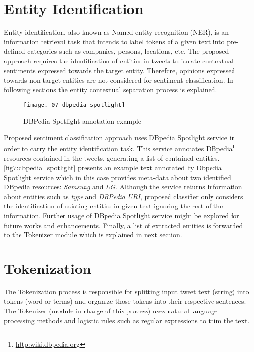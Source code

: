 \pagebreak

\section{Entity Identification}

Entity identification, also known as Named-entity recognition (NER), is an information retrieval task that intends to label tokens of a given text into pre-defined categories such as companies, persons, locations, etc. The proposed approach requires the identification of entities in tweets to isolate contextual sentiments expressed towards the target entity. Therefore, opinions expressed towards non-target entities are not considered for sentiment classification. In following sections the entity contextual separation process is explained. 

\begin{figure}[H]
    \centering
    \texttt{[image: 07\_dbpedia\_spotlight]}
    \caption{DBPedia Spotlight annotation example}
    \label{fig7:dbpedia_spotlight}
\end{figure}

Proposed sentiment classification approach uses DBpedia Spotlight service in order to carry the entity identification task. This service annotates DBpedia\footnote{\url{http:wiki.dbpedia.org}} resources contained in the tweets, generating a list of contained entities. \autoref{fig7:dbpedia_spotlight} presents an example text annotated by Dbpedia Spotlight service which in this case provides meta-data about two identified DBpedia resources: \textit{Samsung} and \textit{LG}. Although the service returns information about entities such as \textit{type} and \textit{DBPedia URI}, proposed classifier only considers the identification of existing entities in given text ignoring the rest of the information. Further usage of DBpedia Spotlight service might be explored for future works and enhancements. Finally, a list of extracted entities is forwarded to the Tokenizer module which is explained in next section. 

\pagebreak

\section{Tokenization}

The Tokenization process is responsible for splitting input tweet text (string) into tokens (word or terms) and organize those tokens into their respective sentences. The Tokenizer (module in charge of this process) uses natural language processing methods and logistic rules such as regular expressions to trim the text. 

